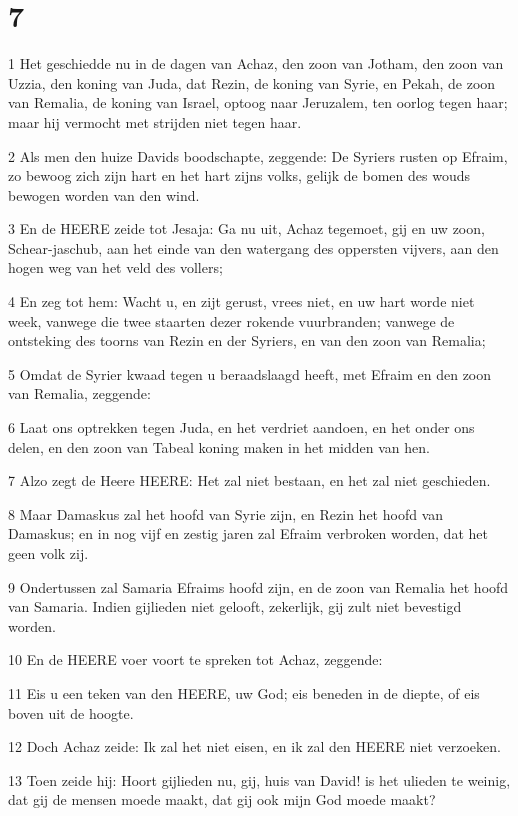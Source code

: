 \chapter{7}

\par 1 Het geschiedde nu in de dagen van Achaz, den zoon van Jotham, den zoon van Uzzia, den koning van Juda, dat Rezin, de koning van Syrie, en Pekah, de zoon van Remalia, de koning van Israel, optoog naar Jeruzalem, ten oorlog tegen haar; maar hij vermocht met strijden niet tegen haar.
\par 2 Als men den huize Davids boodschapte, zeggende: De Syriers rusten op Efraim, zo bewoog zich zijn hart en het hart zijns volks, gelijk de bomen des wouds bewogen worden van den wind.
\par 3 En de HEERE zeide tot Jesaja: Ga nu uit, Achaz tegemoet, gij en uw zoon, Schear-jaschub, aan het einde van den watergang des oppersten vijvers, aan den hogen weg van het veld des vollers;
\par 4 En zeg tot hem: Wacht u, en zijt gerust, vrees niet, en uw hart worde niet week, vanwege die twee staarten dezer rokende vuurbranden; vanwege de ontsteking des toorns van Rezin en der Syriers, en van den zoon van Remalia;
\par 5 Omdat de Syrier kwaad tegen u beraadslaagd heeft, met Efraim en den zoon van Remalia, zeggende:
\par 6 Laat ons optrekken tegen Juda, en het verdriet aandoen, en het onder ons delen, en den zoon van Tabeal koning maken in het midden van hen.
\par 7 Alzo zegt de Heere HEERE: Het zal niet bestaan, en het zal niet geschieden.
\par 8 Maar Damaskus zal het hoofd van Syrie zijn, en Rezin het hoofd van Damaskus; en in nog vijf en zestig jaren zal Efraim verbroken worden, dat het geen volk zij.
\par 9 Ondertussen zal Samaria Efraims hoofd zijn, en de zoon van Remalia het hoofd van Samaria. Indien gijlieden niet gelooft, zekerlijk, gij zult niet bevestigd worden.
\par 10 En de HEERE voer voort te spreken tot Achaz, zeggende:
\par 11 Eis u een teken van den HEERE, uw God; eis beneden in de diepte, of eis boven uit de hoogte.
\par 12 Doch Achaz zeide: Ik zal het niet eisen, en ik zal den HEERE niet verzoeken.
\par 13 Toen zeide hij: Hoort gijlieden nu, gij, huis van David! is het ulieden te weinig, dat gij de mensen moede maakt, dat gij ook mijn God moede maakt?
